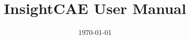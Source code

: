 \documentclass[a4paper]{scrartcl}
\begin{document}
\title{InsightCAE User Manual}
\date{\today}
        
\maketitle
        

\end{document}
